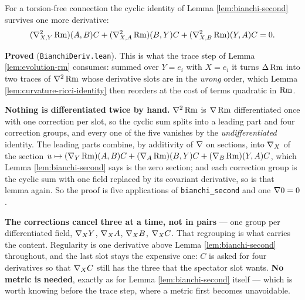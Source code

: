 \begin{lemma}
  \label{lem:bianchi-second-deriv}
  \leanok
  For a torsion-free connection the cyclic identity of Lemma
  \ref{lem:bianchi-second} survives one more derivative:
  \[
    (\nabla^2_{X,Y}\operatorname{Rm})(A,B)C + (\nabla^2_{X,A}\operatorname{Rm})(B,Y)C
      + (\nabla^2_{X,B}\operatorname{Rm})(Y,A)C = 0.
  \]

  \textbf{Proved} (\texttt{BianchiDeriv.lean}). This is what the trace step of
  Lemma \ref{lem:evolution-rm} consumes: summed over $Y = e_i$ with $X = e_i$ it
  turns $\Delta \operatorname{Rm}$ into two traces of $\nabla^2\operatorname{Rm}$ whose derivative slots are in
  the \emph{wrong} order, which Lemma \ref{lem:curvature-ricci-identity} then
  reorders at the cost of terms quadratic in $\operatorname{Rm}$.

  \textbf{Nothing is differentiated twice by hand.} $\nabla^2\operatorname{Rm}$ is $\nabla\operatorname{Rm}$
  differentiated once with one correction per slot, so the cyclic sum splits into
  a leading part and four correction groups, and every one of the five vanishes by
  the \emph{undifferentiated} identity. The leading parts combine, by additivity
  of $\nabla$ on sections, into $\nabla_X$ of the section
  $u \mapsto (\nabla_Y\operatorname{Rm})(A,B)C + (\nabla_A\operatorname{Rm})(B,Y)C + (\nabla_B\operatorname{Rm})(Y,A)C$, which
  Lemma \ref{lem:bianchi-second} says is the zero section; and each correction
  group is the cyclic sum with one field replaced by its covariant derivative, so
  is that lemma again. So the proof is five applications of
  \texttt{bianchi\_second} and one $\nabla 0 = 0$.

  \textbf{The corrections cancel three at a time, not in pairs} --- one group per
  differentiated field, $\nabla_X Y$, $\nabla_X A$, $\nabla_X B$, $\nabla_X C$. That
  regrouping is what carries the content. Regularity is one derivative above
  Lemma \ref{lem:bianchi-second} throughout, and the last slot stays the
  expensive one: $C$ is asked for four derivatives so that $\nabla_X C$ still has
  the three that the spectator slot wants. \textbf{No metric is needed}, exactly
  as for Lemma \ref{lem:bianchi-second} itself --- which is worth knowing before
  the trace step, where a metric first becomes unavoidable.


\end{lemma}
